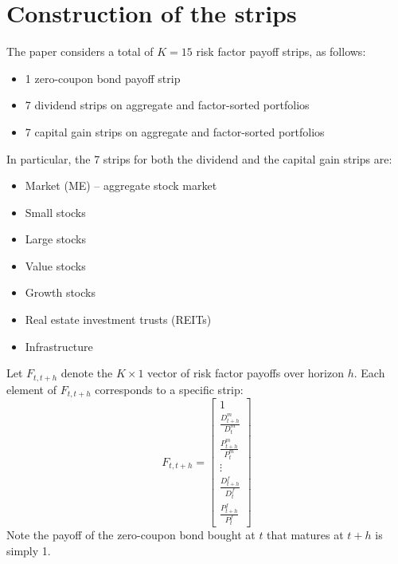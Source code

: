 \documentclass[12pt]{article}
\begin{document}
\section{Construction of the strips}\label{sec:construction-of-the-strips}
The paper considers a total of $K=15$ risk factor payoff strips, as follows:
    \begin{itemize}
        \item 1 zero-coupon bond payoff strip
        \item 7 dividend strips on aggregate and factor-sorted portfolios
        \item 7 capital gain strips on aggregate and factor-sorted portfolios
    \end{itemize}
    In particular, the 7 strips for both the dividend and the capital gain strips are:
    \begin{itemize}
        \item Market (ME) – aggregate stock market
        \item Small stocks
        \item Large stocks
        \item Value stocks
        \item Growth stocks
        \item Real estate investment trusts (REITs)
        \item Infrastructure
    \end{itemize}
    Let $F_{t,t+h}$ denote the $K \times 1$ vector of risk factor payoffs over horizon $h$.
    Each element of $F_{t,t+h}$ corresponds to a specific strip:
    \begin{equation}
        F_{t,t+h} = \begin{bmatrix}
                        1 \\
                        \frac{D^m_{t+h}}{D^m_t} \\
                        \frac{P^m_{t+h}}{P^m_t} \\
                        \vdots \\
                        \frac{D^f_{t+h}}{D^f_t} \\
                        \frac{P^f_{t+h}}{P^f_t}
                    \end{bmatrix}
        \label{eq:risk_factors}
    \end{equation}
    Note the payoff of the zero-coupon bond bought at $t$ that matures at $t+h$ is simply 1.
\end{document}
